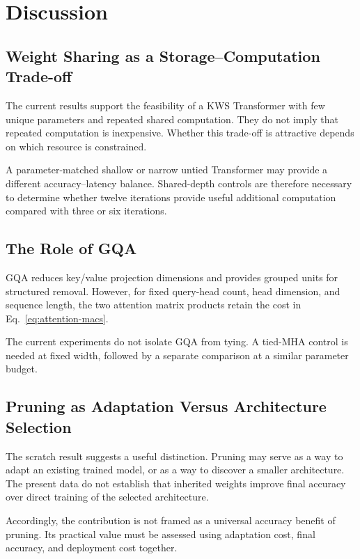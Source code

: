 \documentclass[journal]{IEEEtran}
\begin{document}
\section{Discussion}

\subsection{Weight Sharing as a Storage--Computation Trade-off}

The current results support the feasibility of a KWS Transformer
with few unique parameters and repeated shared computation.
They do not imply that repeated computation is inexpensive.
Whether this trade-off is attractive depends on which resource
is constrained.

A parameter-matched shallow or narrow untied Transformer may
provide a different accuracy--latency balance.
Shared-depth controls are therefore necessary to determine whether
twelve iterations provide useful additional computation compared
with three or six iterations.

\subsection{The Role of GQA}

GQA reduces key/value projection dimensions and provides grouped
units for structured removal.
However, for fixed query-head count, head dimension, and sequence
length, the two attention matrix products retain the cost in
Eq.~\eqref{eq:attention-macs}.

The current experiments do not isolate GQA from tying.
A tied-MHA control is needed at fixed width, followed by a
separate comparison at a similar parameter budget.

\subsection{Pruning as Adaptation Versus Architecture Selection}

The scratch result suggests a useful distinction.
Pruning may serve as a way to adapt an existing trained model,
or as a way to discover a smaller architecture.
The present data do not establish that inherited weights improve
final accuracy over direct training of the selected architecture.

Accordingly, the contribution is not framed as a universal
accuracy benefit of pruning.
Its practical value must be assessed using adaptation cost,
final accuracy, and deployment cost together.
\end{document}
